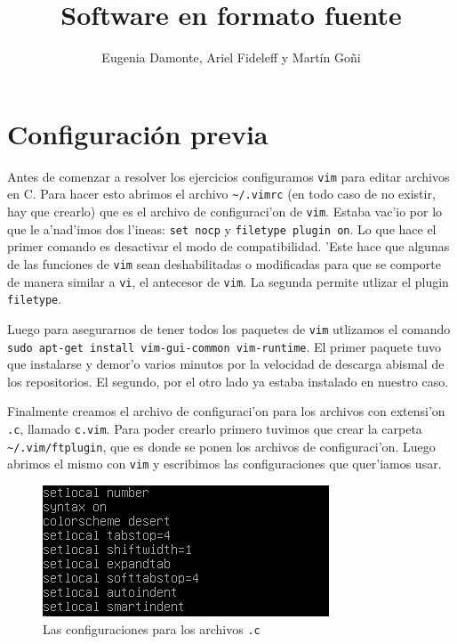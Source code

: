 \documentclass[11pt]{article}
\title{\Huge Software en formato fuente}
\author{Eugenia Damonte, Ariel Fideleff y Mart\'in Go\~ni}
\date{}
\begin{document}
	\maketitle
	\newpage
	\tableofcontents
	\newpage
	
	
	\section{Configuraci\'on previa}
		Antes de comenzar a resolver los ejercicios configuramos \texttt{vim} para editar archivos en C. Para hacer esto abrimos el archivo \texttt{\textasciitilde/.vimrc} (en todo caso de no existir, hay que crearlo) que es el archivo de configuraci'on de \texttt{vim}. Estaba vac'io por lo que le a'nad'imos dos l'ineas: \texttt{set nocp} y \texttt{filetype plugin on}. Lo que hace el primer comando es desactivar el modo de compatibilidad. 'Este hace que algunas de las funciones de \texttt{vim} sean deshabilitadas o modificadas para que se comporte de manera similar a \texttt{vi}, el antecesor de \texttt{vim}. La segunda permite utlizar el plugin \texttt{filetype}.
		
		Luego para asegurarnos de tener todos los paquetes de \texttt{vim} utlizamos el comando \texttt{sudo apt-get install vim-gui-common vim-runtime}. El primer paquete tuvo que instalarse y demor'o varios minutos por la velocidad de descarga abismal de los repositorios. El segundo, por el otro lado ya estaba instalado en nuestro caso.
		
		Finalmente creamos el archivo de configuraci'on para los archivos con extensi'on \texttt{.c}, llamado \texttt{c.vim}. Para poder crearlo primero tuvimos que crear la carpeta \texttt{\textasciitilde/.vim/ftplugin}, que es donde se ponen los archivos de configuraci'on. Luego abrimos el mismo con \texttt{vim} y escribimos las configuraciones que quer'iamos usar.
		
		
		\begin{figure}[H]
			\centering
			\includegraphics[width=.7\linewidth]{Images/Preamble/Preamble.PNG}
			\caption{Las configuraciones para los archivos \texttt{.c}}
			\label{fig:vim-setup}
		\end{figure}
		
\end{document}
